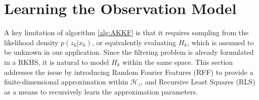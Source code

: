 \documentclass[conference]{IEEEtran}
\begin{document}
\begin{algorithm}[ht]
\begin{algorithmic}
\end{algorithmic}\caption{1 AKKF iteration}\label{alg:AKKF}
\end{algorithm}

\section{Learning the Observation Model}\label{sec:apprentissage}

A key limitation of algorithm \ref{alg:AKKF} is that it requires sampling from the likelihood density $p(z_k|x_k)$, or equivalently evaluating $H_k$, which is assumed to be unknown in our application. Since the filtering problem is already formulated in a RKHS, it is natural to model $H_k$ within the same space. This section addresses the issue by introducing Random Fourier Features (RFF) \cite{bib:RFF, bib:RFF_survey} to provide a finite-dimensional approximation within $\mathcal{H}_z$, and Recursive Least Squares (RLS) \cite{bib:RFF_RLS} as a means to recursively learn the approximation parameters.
\end{document}
